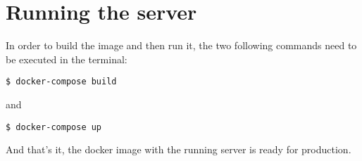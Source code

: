 \section{Running the server}
In order to build the image and then run it, the two following commands need to be executed in the terminal:
\begin{verbatim}
$ docker-compose build
\end{verbatim}
and
\begin{verbatim}
$ docker-compose up
\end{verbatim}
And that's it, the docker image with the running server is ready for production.
